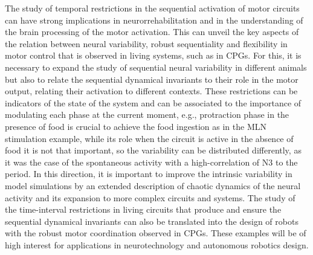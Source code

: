 The study of temporal restrictions in the sequential activation of motor circuits can have strong implications in neurorrehabilitation and in the understanding of the brain processing of the motor activation. This can unveil the key aspects of the relation between neural variability, robust sequentiality and flexibility in motor control that is observed in living systems, such as in CPGs. For this, it is necessary to expand the study of sequential neural  variability in different animals but also to relate the sequential dynamical invariants to their role in the motor output, relating their activation to different contexts. These restrictions can be indicators of the state of the system and can be associated to the importance of modulating each phase at the current moment, e.g., protraction phase in the presence of food is crucial to achieve the food ingestion as in the MLN stimulation example, while its role when the circuit is active in the absence of food it is not that important, so the variability can be distributed differently, as it was the case of the spontaneous activity with a high-correlation of N3 to the period. In this direction, it is important to improve the intrinsic variability in model simulations by an extended description of chaotic dynamics of the neural activity and its expansion to more complex circuits and systems. The study of the time-interval restrictions in living circuits that produce and ensure the sequential dynamical invariants can also be translated into the design of robots with the robust motor coordination observed in CPGs. These examples will be of high interest for applications in neurotechnology and autonomous robotics design. 

